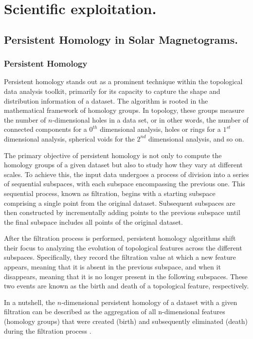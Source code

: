 \chapter{\label{CH:Science}Scientific exploitation.}

\section{Persistent Homology in Solar Magnetograms.}

\subsection{Persistent Homology}

Persistent homology stands out as a prominent technique within the topological data analysis toolkit, primarily for its capacity to capture the shape and distribution information of a dataset. The algorithm is rooted in the mathematical framework of homology groups. In topology, these groups measure the number of $n$-dimensional holes in a data set, or in other words, the number of connected components for a  $0^{th}$ dimensional analysis, holes or rings for a $1^{st}$ dimensional analysis, spherical voids for the $2^{nd}$ dimensional analysis, and so on. 

The primary objective of persistent homology is not only to compute the homology groups of a given dataset but also to study how they vary at different scales. To achieve this, the input data undergoes a process of division into a series of sequential subspaces, with each subspace encompassing the previous one. This sequential process, known as filtration, begins with a starting subspace comprising a single point from the original dataset. Subsequent subspaces are then constructed by incrementally adding points to the previous subspace until the final subspace includes all points of the original dataset. 

After the filtration process is performed, persistent homology algorithms shift their focus to analyzing the evolution of topological features across the different subspaces. Specifically, they record the filtration value at which a new feature appears, meaning that it is absent in the previous subspace, and when it disappears, meaning that it is no longer present in the following subspaces. These two events are known as the birth and death of a topological feature, respectively. 

In a nutshell, the $n$-dimensional persistent homology of a dataset with a given filtration can be described as the aggregation of all n-dimensional features (homology groups) that were created (birth) and subsequently eliminated (death) during the filtration process \citep{ph_filtration}.

